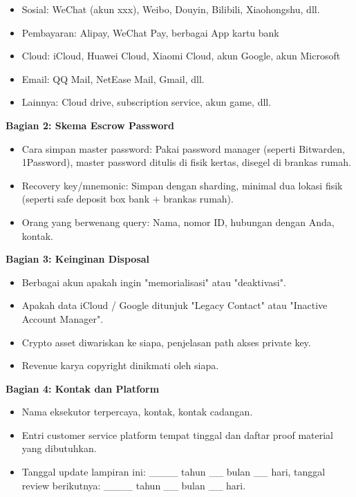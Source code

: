 \begin{itemize}
  \item Sosial: WeChat (akun xxx), Weibo, Douyin, Bilibili, Xiaohongshu, dll.
  \item Pembayaran: Alipay, WeChat Pay, berbagai App kartu bank
  \item Cloud: iCloud, Huawei Cloud, Xiaomi Cloud, akun Google, akun Microsoft
  \item Email: QQ Mail, NetEase Mail, Gmail, dll.
  \item Lainnya: Cloud drive, subscription service, akun game, dll.
\end{itemize}

\textbf{Bagian 2: Skema Escrow Password}

\begin{itemize}
  \item Cara simpan master password: Pakai password manager (seperti Bitwarden, 1Password), master password ditulis di fisik kertas, disegel di brankas rumah.
  \item Recovery key/mnemonic: Simpan dengan sharding, minimal dua lokasi fisik (seperti safe deposit box bank + brankas rumah).
  \item Orang yang berwenang query: Nama, nomor ID, hubungan dengan Anda, kontak.
\end{itemize}

\textbf{Bagian 3: Keinginan Disposal}

\begin{itemize}
  \item Berbagai akun apakah ingin "memorialisasi" atau "deaktivasi".
  \item Apakah data iCloud / Google ditunjuk "Legacy Contact" atau "Inactive Account Manager".
  \item Crypto asset diwariskan ke siapa, penjelasan path akses private key.
  \item Revenue karya copyright dinikmati oleh siapa.
\end{itemize}

\textbf{Bagian 4: Kontak dan Platform}

\begin{itemize}
  \item Nama eksekutor terpercaya, kontak, kontak cadangan.
  \item Entri customer service platform tempat tinggal dan daftar proof material yang dibutuhkan.
  \item Tanggal update lampiran ini: \_\_\_\_ tahun \_\_ bulan \_\_ hari, tanggal review berikutnya: \_\_\_\_ tahun \_\_ bulan \_\_ hari.
\end{itemize}

